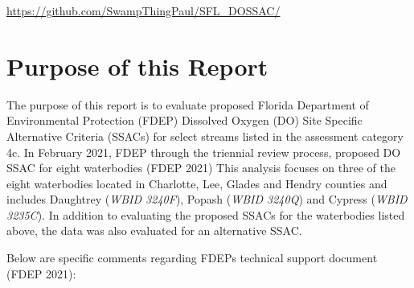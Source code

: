 \documentclass[]{interact}
\theoremstyle{plain}%
\theoremstyle{definition}
\theoremstyle{remark}
\begin{document}
\begin{github}
\url{https://github.com/SwampThingPaul/SFL_DOSSAC/}
\end{github}

\newpage

\hypertarget{purpose-of-this-report}{%
\section{Purpose of this Report}\label{purpose-of-this-report}}

The purpose of this report is to evaluate proposed Florida Department of
Environmental Protection (FDEP) Dissolved Oxygen (DO) Site Specific
Alternative Criteria (SSACs) for select streams listed in the assessment
category 4c. In February 2021, FDEP through the triennial review
process, proposed DO SSAC for eight waterbodies (FDEP 2021) This
analysis focuses on three of the eight waterbodies located in Charlotte,
Lee, Glades and Hendry counties and includes Daughtrey
(\textit{WBID 3240F}), Popash (\textit{WBID 3240Q}) and Cypress
(\textit{WBID 3235C}). In addition to evaluating the proposed SSACs for
the waterbodies listed above, the data was also evaluated for an
alternative SSAC.

Below are specific comments regarding FDEPs technical support document
(FDEP 2021):
\end{document}
